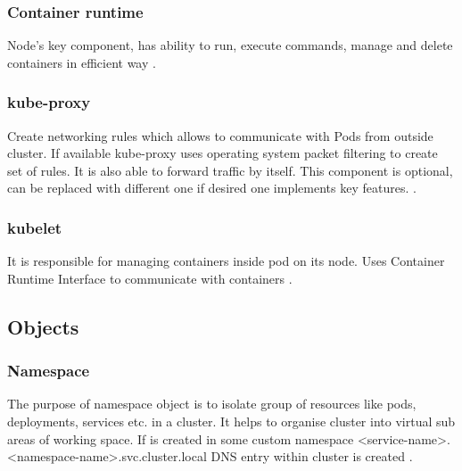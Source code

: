 \subsubsection{Container runtime}
\label{sec:containerRuntime}

Node's key component, has ability to run, execute commands, manage and delete containers in efficient way \cite{KubernetesArch}. 



\subsubsection{kube-proxy}
\label{sec:kubeProxy}

Create networking rules which allows to communicate with Pods from outside cluster. If available kube-proxy uses operating system packet filtering to create set of rules. It is also able to forward traffic by itself. This component is optional, can be replaced with different one if desired one implements key features. \cite{KubernetesArch}.


\subsubsection{kubelet}
\label{sec:kubelet}

It is responsible for managing containers inside pod on its node. Uses Container Runtime Interface to communicate with containers \cite{KubernetesArch} \cite{KubernetesCRI}.


\subsection{Objects}    
\label{sec:k8s_objects}

\subsubsection{Namespace}
\label{sec:namespace}

The purpose of namespace object is to isolate group of resources like pods, deployments, services etc. in a cluster. It helps to organise cluster into virtual sub areas of working space. If \textit{} is created in some custom namespace <service-name>.<namespace-name>.svc.cluster.local DNS entry within cluster is created \cite{KubernetesNamespaces}.

